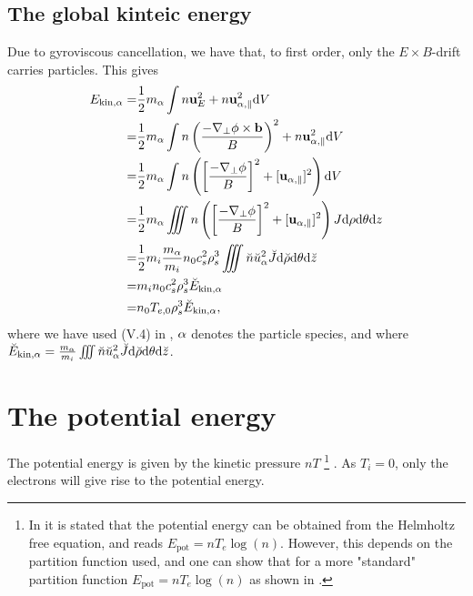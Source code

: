 \subsection{The global kinteic energy}
%
Due to gyroviscous cancellation, we have that, to first order, only the $E\times B$-drift carries particles.
This gives
%
\begin{align*}
    E_{\text{kin},\alpha}
    =& \frac{1}{2}m_{\alpha}\int
       n\mathbf{u}_E^2
       + n\mathbf{u}_{\alpha,\parallel}^2 \text{d} V
     \\
    =& \frac{1}{2}m_{\alpha}\int
       n\left(\frac{-\nabla_\perp\phi
              \times\mathbf{b}}{B}\right)^2
       + n\mathbf{u}_{\alpha,\parallel}^2 \text{d} V
    \\
    =& \frac{1}{2}m_{\alpha}\int
       n\left(\left[\frac{-\nabla_\perp\phi}{B}\right]^2
       + [\mathbf{u}_{\alpha,\parallel}]^2\right) \text{d} V
   \\
    =& \frac{1}{2}m_{\alpha}\iiint
       n\left(\left[\frac{-\nabla_\perp\phi}{B}\right]^2
       + [\mathbf{u}_{\alpha,\parallel}]^2\right)
       J \text{d}\rho \text{d}\theta \text{d} z
    \\
    =& \frac{1}{2}m_i\frac{m_{\alpha}}{m_i}
       n_0c_s^2\rho_s^3
       \iiint
       \breve{n}\breve{u}_\alpha^2
       \breve{J} \text{d} \breve{\rho} \text{d}\theta \text{d} \breve{z}
    \\
    =& m_in_0c_s^2\rho_s^3 \breve{E}_{\text{kin},\alpha}
    \\
    =& n_0T_{e,0}\rho_s^3 \breve{E}_{\text{kin},\alpha},
\end{align*}
%
where we have used (V.4) in \cite{Dhaeseleer1991book}, $\alpha$ denotes the particle species, and where $\breve{E}_{\text{kin},\alpha} = \frac{m_{\alpha}}{m_i}\iiint \breve{n}\breve{u}_\alpha^2 \breve{J} \text{d} \breve{\rho} \text{d}\theta \text{d} \breve{z}$.

%
\section{The potential energy}
%
The potential energy is given by the kinetic pressure $nT$
%
\footnote{In \cite{Wiesenberger2014} it is stated that the potential energy can be obtained from the Helmholtz free equation, and reads $E_{\text{pot}}=nT_e\log(n)$.
    However, this depends on the partition function used, and one can show that for a more "standard" partition function $E_{\text{pot}}=nT_e\log(n)$ as shown in \cite{Kittel1980book}.}%
.
As $T_i=0$, only the electrons will give rise to the potential energy.

